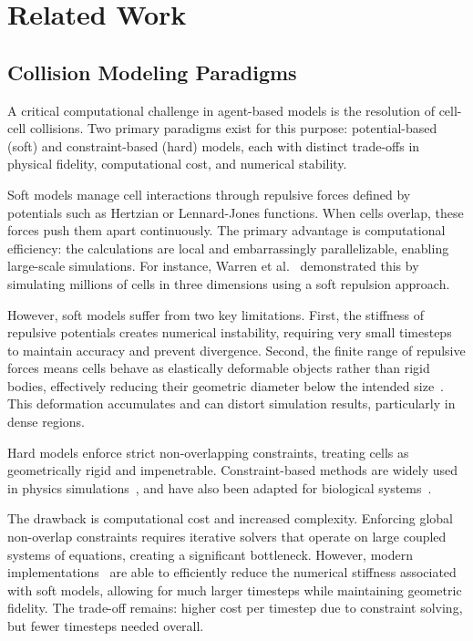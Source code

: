 \documentclass[conference]{IEEEtran}
\begin{document}
\section{Related Work}

\subsection{Collision Modeling Paradigms}

A critical computational challenge in agent-based models is the resolution of cell-cell collisions. Two primary paradigms exist for this purpose: potential-based (soft) and constraint-based (hard) models, each with distinct trade-offs in physical fidelity, computational cost, and numerical stability.

\begin{description}[style=nextline]
    \item[Potential-Based (Soft) Collision Models]
        Soft models manage cell interactions through repulsive forces defined by potentials such as Hertzian or Lennard-Jones functions. When cells overlap, these forces push them apart continuously. The primary advantage is computational efficiency: the calculations are local and embarrassingly parallelizable, enabling large-scale simulations. For instance, Warren et al.~\cite{Warren2019} demonstrated this by simulating millions of cells in three dimensions using a soft repulsion approach.

        However, soft models suffer from two key limitations. First, the stiffness of repulsive potentials creates numerical instability, requiring very small timesteps to maintain accuracy and prevent divergence. Second, the finite range of repulsive forces means cells behave as elastically deformable objects rather than rigid bodies, effectively reducing their geometric diameter below the intended size~\cite{Yan2019}. This deformation accumulates and can distort simulation results, particularly in dense regions.

    \item[Constraint-Based (Hard) Collision Models]
        Hard models enforce strict non-overlapping constraints, treating cells as geometrically rigid and impenetrable. Constraint-based methods are widely used in physics simulations~\cite{Tasora2008,Macklin2014,Li2021,Ferguson2021}, and have also been adapted for biological systems~\cite{Rudge2012,Weady2024,Yan2019}.

        The drawback is computational cost and increased complexity. Enforcing global non-overlap constraints requires iterative solvers that operate on large coupled systems of equations, creating a significant bottleneck. However, modern implementations~\cite{Yan2019} are able to efficiently reduce the numerical stiffness associated with soft models, allowing for much larger timesteps while maintaining geometric fidelity. The trade-off remains: higher cost per timestep due to constraint solving, but fewer timesteps needed overall.
\end{description}
\end{document}
